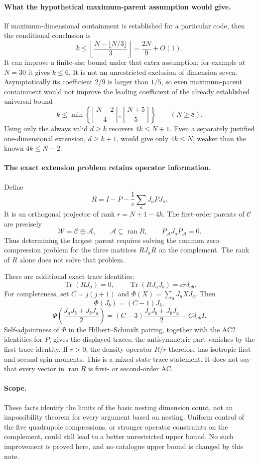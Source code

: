 \documentclass[11pt]{article}
\begin{document}
\paragraph{What the hypothetical maximum-parent assumption would give.}
If maximum-dimensional containment is established for a particular code,
then the conditional conclusion is
\[
 k\le\left\lfloor\frac{N-\lfloor N/3\rfloor}{3}\right\rfloor
 =\frac{2N}{9}+O(1).
\]
It can improve a finite-size bound under that extra assumption; for
example at $N=30$ it gives $k\le6$. It is not an unrestricted exclusion
of dimension seven. Asymptotically its coefficient $2/9$ is larger than
$1/5$, so even maximum-parent containment would not improve the leading
coefficient of the already established universal bound
\[
 k\le\min\left\{\left\lfloor\frac{N-2}{4}\right\rfloor,
                   \left\lfloor\frac{N+5}{5}\right\rfloor\right\}
 \qquad(N\ge8).
\]
Using only the always valid $d\ge k$ recovers $4k\le N+1$.
Even a separately justified one-dimensional extension, $d\ge k+1$,
would give only $4k\le N$, weaker than the known $4k\le N-2$.

\paragraph{The exact extension problem retains operator information.}
Define
\[
 R=I-P-\frac1c\sum_aJ_aPJ_a.
\]
It is an orthogonal projector of rank $r=N+1-4k$. The first-order parents
of $\mathcal C$ are precisely
\[
 \mathcal W=\mathcal C\oplus\mathcal A,\qquad
 \mathcal A\subseteq\operatorname{ran}R,\qquad
 P_{\mathcal A}J_aP_{\mathcal A}=0.
\]
Thus determining the largest parent requires solving the common zero
compression problem for the three matrices $RJ_aR$ on the complement.
The rank of $R$ alone does not solve that problem.

There are additional exact trace identities:
\[
 \operatorname{Tr}(RJ_a)=0,\qquad
 \operatorname{Tr}(RJ_aJ_b)=cr\delta_{ab}.
\]
For completeness, set $C=j(j+1)$ and
$\Phi(X)=\sum_aJ_aXJ_a$. Then
\[
 \Phi(J_b)=(C-1)J_b,
\]
\[
 \Phi\!\left(\frac{J_aJ_b+J_bJ_a}{2}\right)
 =(C-3)\frac{J_aJ_b+J_bJ_a}{2}+C\delta_{ab}I.
\]
Self-adjointness of $\Phi$ in the Hilbert--Schmidt pairing, together with
the AC2 identities for $P$, gives the displayed traces; the antisymmetric
part vanishes by the first trace identity. If $r>0$, the density operator
$R/r$ therefore has isotropic first and second spin moments. This is a
mixed-state trace statement. It does not say that every vector in
$\operatorname{ran}R$ is first- or second-order AC.

\paragraph{Scope.}
These facts identify the limits of the basic nesting dimension count,
not an impossibility theorem for every argument based on nesting.
Uniform control of the five quadrupole compressions, or stronger operator
constraints on the complement, could still lead to a better unrestricted
upper bound. No such improvement is proved here, and no catalogue upper
bound is changed by this note.
\end{document}
